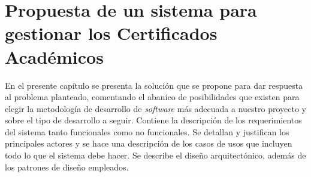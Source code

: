 \chapter{Propuesta de un sistema para gestionar los Certificados Académicos}\label{chapter:proposal}

En el presente capítulo se presenta la solución que se propone para dar respuesta al problema planteado, comentando el abanico de posibilidades que existen para elegir la metodología de desarrollo de \textit{software} más adecuada a nuestro proyecto y sobre el tipo de desarrollo a seguir. Contiene la descripción de los requerimientos del sistema tanto funcionales como no funcionales. Se detallan y justifican los principales actores y se hace una descripción de los casos de usos que incluyen todo lo que el sistema debe hacer. Se describe el diseño arquitectónico, además de los patrones de diseño empleados.






